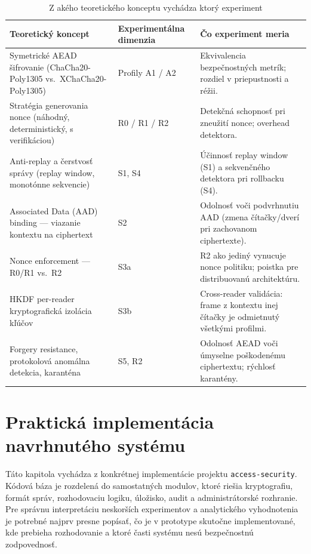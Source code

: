 \documentclass[journal,a4paper,onecolumn]{IEEEtran}
\begin{document}
\begin{table}[htbp]
\renewcommand{\arraystretch}{1.3}
\centering
\caption{Z akého teoretického konceptu vychádza ktorý experiment}
\label{tab:theory-to-exp}
\small
\begin{tabular}{p{3.8cm} p{2.4cm} p{5.6cm}}
\toprule
\textbf{Teoretický koncept} & \textbf{Experimentálna dimenzia} & \textbf{Čo experiment meria} \\
\midrule
Symetrické AEAD šifrovanie (ChaCha20-Poly1305 vs.\ XChaCha20-Poly1305) & Profily A1 / A2 & Ekvivalencia bezpečnostných metrík; rozdiel v priepustnosti a réžii. \\
\midrule
Stratégia generovania nonce (náhodný, deterministický, s verifikáciou) & R0 / R1 / R2 & Detekčná schopnosť pri zneužití nonce; overhead detektora. \\
\midrule
Anti-replay a čerstvosť správy (replay window, monotónne sekvencie) & S1, S4 & Účinnosť replay window (S1) a sekvenčného detektora pri rollbacku (S4). \\
\midrule
Associated Data (AAD) binding — viazanie kontextu na ciphertext & S2 & Odolnosť voči podvrhnutiu AAD (zmena čítačky/dverí pri zachovanom ciphertexte). \\
\midrule
Nonce enforcement --- R0/R1 vs.\ R2 & S3a & R2 ako jediný vynucuje nonce politiku; poistka pre distribuovanú architektúru. \\
\midrule
HKDF per-reader kryptografická izolácia kľúčov & S3b & Cross-reader validácia: frame z kontextu inej čítačky je odmietnutý všetkými profilmi. \\
\midrule
Forgery resistance, protokolová anomálna detekcia, karanténa & S5, R2 & Odolnosť AEAD voči úmyselne poškodenému ciphertextu; rýchlosť karantény. \\
\bottomrule
\end{tabular}
\end{table}




\section{Praktická implementácia navrhnutého systému}

Táto kapitola vychádza z konkrétnej implementácie projektu \texttt{access-security}. Kódová báza je rozdelená do samostatných modulov, ktoré riešia kryptografiu, formát správ, rozhodovaciu logiku, úložisko, audit a administrátorské rozhranie. Pre správnu interpretáciu neskorších experimentov a analytického vyhodnotenia je potrebné najprv presne popísať, čo je v prototype skutočne implementované, kde prebieha rozhodovanie a ktoré časti systému nesú bezpečnostnú zodpovednosť.
\end{document}
